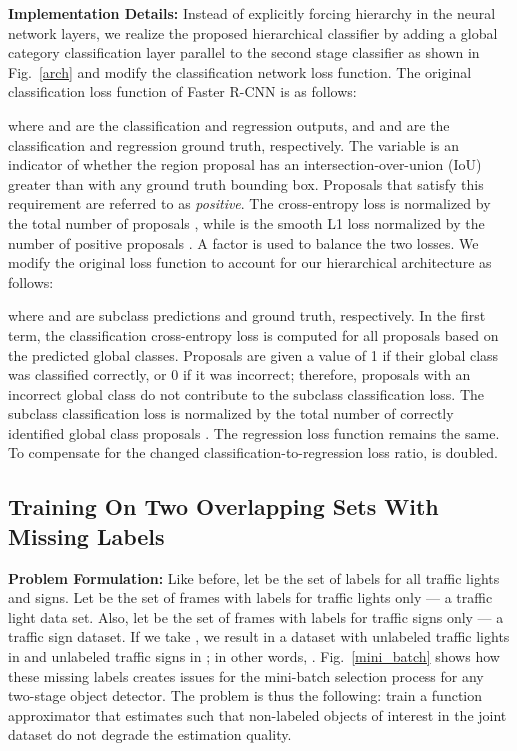\documentclass[10pt, conference, compsocconf]{IEEEtran}
\newcommand{\fig}[1]{Fig.~\ref{#1}}
\begin{document}
\noindent\textbf{Implementation Details:}  
Instead of explicitly forcing hierarchy in the neural network layers, we realize the proposed hierarchical classifier by adding a global category classification layer parallel to the second stage classifier as shown in \fig{arch} and modify the classification network loss function. The original classification loss function of Faster R-CNN is as follows:


where  and  are the classification and regression outputs, and  and  are the classification and regression ground truth, respectively. The variable  is an indicator of whether the region proposal has an intersection-over-union (IoU) greater than  with any ground truth bounding box. Proposals that satisfy this requirement are referred to as \textit{positive}. The cross-entropy loss  is normalized by the total number of proposals , while  is the smooth L1 loss normalized by the number of positive proposals . A factor  is used to balance the two losses. We modify the original loss function to account for our hierarchical architecture as follows:


where  and  are subclass predictions and ground truth, respectively. In the first term, the classification cross-entropy loss is computed for all proposals based on the predicted global classes. Proposals are given a  value of 1 if their global class was classified correctly, or 0 if it was incorrect; therefore, proposals with an incorrect global class do not contribute to the subclass classification loss. The subclass classification loss is normalized by the total number of correctly identified global class proposals . The regression loss function remains the same. To compensate for the changed classification-to-regression loss ratio,  is doubled.

\subsection{Training On Two Overlapping Sets With Missing Labels}
\noindent\textbf{Problem Formulation:} 
Like before, let  be the set of labels for all traffic lights and signs. Let  be the set of frames with labels for traffic lights only --- a traffic light data set. Also, let  be the set of frames with labels for traffic signs only --- a traffic sign dataset. If we take , we result in a dataset with unlabeled traffic lights in  and unlabeled traffic signs in ; in other words, . \fig{mini_batch} shows how these missing labels creates issues for the mini-batch selection process for any two-stage object detector. The problem is thus the following: train a function approximator that estimates  such that non-labeled objects of interest in the joint dataset do not degrade the estimation quality. \\
\end{document}

